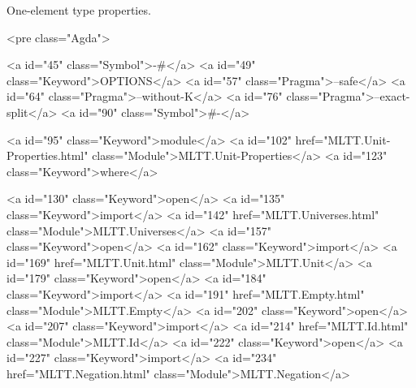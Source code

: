 One-element type properties.

<pre class="Agda">

<a id="45" class="Symbol">{-#</a> <a id="49" class="Keyword">OPTIONS</a> <a id="57" class="Pragma">--safe</a> <a id="64" class="Pragma">--without-K</a> <a id="76" class="Pragma">--exact-split</a> <a id="90" class="Symbol">#-}</a>

<a id="95" class="Keyword">module</a> <a id="102" href="MLTT.Unit-Properties.html" class="Module">MLTT.Unit-Properties</a> <a id="123" class="Keyword">where</a>

<a id="130" class="Keyword">open</a> <a id="135" class="Keyword">import</a> <a id="142" href="MLTT.Universes.html" class="Module">MLTT.Universes</a>
<a id="157" class="Keyword">open</a> <a id="162" class="Keyword">import</a> <a id="169" href="MLTT.Unit.html" class="Module">MLTT.Unit</a>
<a id="179" class="Keyword">open</a> <a id="184" class="Keyword">import</a> <a id="191" href="MLTT.Empty.html" class="Module">MLTT.Empty</a>
<a id="202" class="Keyword">open</a> <a id="207" class="Keyword">import</a> <a id="214" href="MLTT.Id.html" class="Module">MLTT.Id</a>
<a id="222" class="Keyword">open</a> <a id="227" class="Keyword">import</a> <a id="234" href="MLTT.Negation.html" class="Module">MLTT.Negation</a>

